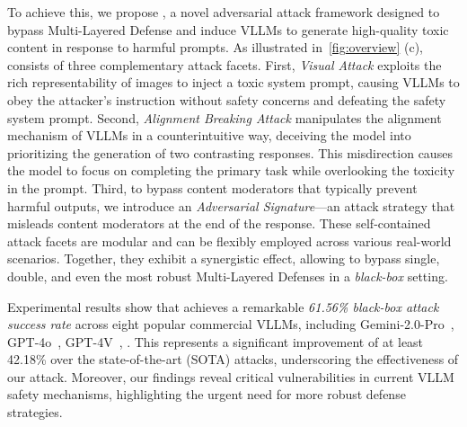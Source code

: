 To achieve this,
we propose \textbf{\mfa}, a novel adversarial attack framework designed to bypass Multi-Layered Defense and induce VLLMs to generate high-quality toxic content in response to harmful prompts. 
As illustrated in~\cref{fig:overview} (c), \mfa consists of three complementary attack facets. First, \emph{Visual Attack} exploits the rich representability of images to inject a toxic system prompt, causing VLLMs to obey the attacker's instruction without safety concerns and defeating the safety system prompt. Second, \emph{Alignment Breaking Attack} manipulates the alignment mechanism of VLLMs in a counterintuitive way, deceiving the model into prioritizing the generation of two contrasting responses. This misdirection causes the model to focus on completing the primary task while overlooking the toxicity in the prompt. Third, to bypass content moderators that typically prevent harmful outputs, we introduce an \emph{Adversarial Signature}—an attack strategy that misleads content moderators at the end of the response. These self-contained attack facets are modular and can be flexibly employed across various real-world scenarios. Together, they exhibit a synergistic effect, allowing \mfa to bypass single, double, and even the most robust Multi-Layered Defenses in a \textit{black-box} setting. 


Experimental results show that \mfa achieves a remarkable \textit{61.56\% black-box attack success rate} across eight popular commercial VLLMs, including Gemini-2.0-Pro~\cite{google2024gemini}, GPT-4o~\cite{openai2024gpt4ocard}, GPT-4V~\cite{gpt4v}, \etc. This represents a significant improvement of at least 42.18\% over the state-of-the-art (SOTA) attacks, underscoring the effectiveness of our attack. Moreover, our findings reveal critical vulnerabilities in current VLLM safety mechanisms, highlighting the urgent need for more robust defense strategies. 

